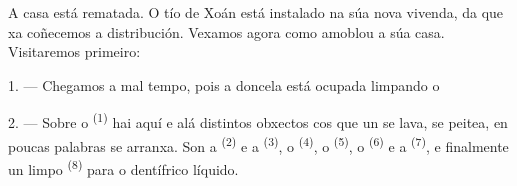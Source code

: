 %
%
%

\VUsaut{6.0mm}
\VUsaut{1.4mm}
\VUsaut{0.4mm}
\VUsaut{2.2mm}

A casa está rematada. O tío de Xoán está instalado na súa nova vivenda, da que xa coñecemos a
distribución. Vexamos agora como amoblou a súa casa. Visitaremos primeiro:

\VUsaut{3.0mm}

1. --- Chegamos a mal tempo, pois a doncela está ocupada limpando o 

2. --- Sobre o  \textsuperscript{(1)} hai aquí e alá distintos obxectos cos
que un se lava, se peitea, en poucas palabras se arranxa. Son a
 \textsuperscript{(2)} e a 
\textsuperscript{(3)}, o  \textsuperscript{(4)}, o
 \textsuperscript{(5)}, o  \textsuperscript{(6)} e a
 \textsuperscript{(7)}, e finalmente un  limpo
\textsuperscript{(8)} para o dentífrico líquido.

